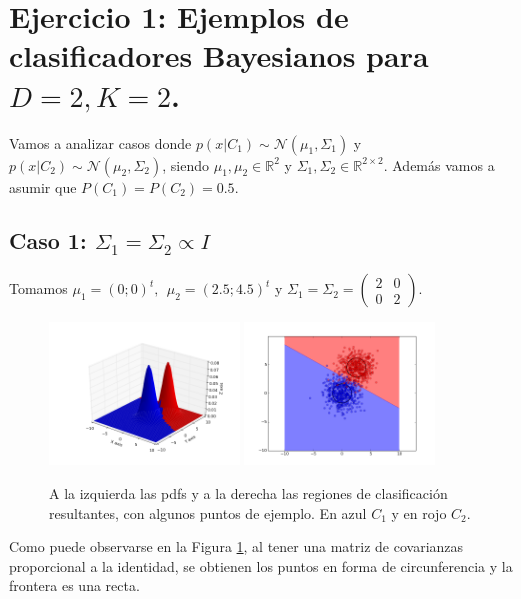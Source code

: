 \documentclass[a4paper,11pt]{article}
\newcommand{\real}{\mathds{R}}
\begin{document}
\newpage

\section{Ejercicio 1: Ejemplos de clasificadores Bayesianos para $D=2, K=2$.}

Vamos a analizar casos donde $p(x|C_1)\sim\mathcal{N}(\mu_1, \Sigma_1)$ y $p(x|C_2)\sim\mathcal{N}(\mu_2, \Sigma_2)$, siendo $\mu_1,\mu_2\in\real^2$ y $\Sigma_1,\Sigma_2\in\real^{2\times 2}$. Además vamos a asumir que $P(C_1)=P(C_2)=0.5$.

\subsection*{Caso 1: $\Sigma_1 = \Sigma_2 \propto I$}
Tomamos $\mu_1 = (0;0)^t, \ \ \mu_2 = (2.5; 4.5)^t$ y $\Sigma_1=\Sigma_2 = \begin{pmatrix}2 & 0\\ 0 & 2 \end{pmatrix}$.

\begin{figure}[h!]
\centering
\includegraphics[width=0.45\textwidth]{img/ej1-caso1-pdf.png}
\includegraphics[width=0.45\textwidth]{img/ej1-caso1-region.png}
\caption{A la izquierda las pdfs y a la derecha las regiones de clasificación resultantes, con algunos puntos de ejemplo. En azul $C_1$ y en rojo $C_2$.}
\label{ej1_caso1}
\end{figure}

Como puede observarse en la Figura \ref{ej1_caso1}, al tener una matriz de covarianzas proporcional a la identidad, se obtienen los puntos en forma de circunferencia y la frontera es una recta.
\end{document}
